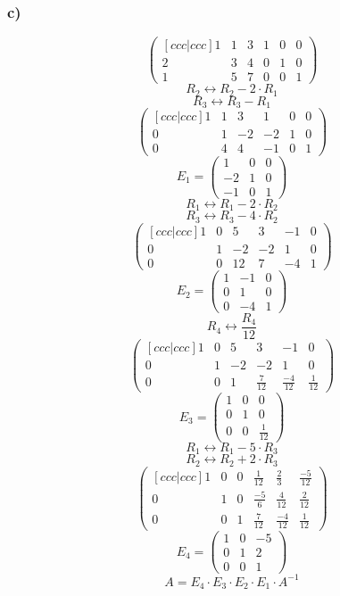 \documentclass[lineaire_algebra_oplossingen.tex]{subfiles}
\begin{document}
\subsubsection*{c)}
\[
\begin{pmatrix}[ccc|ccc]
1 & 1 & 3 & 1 & 0 & 0\\
2 & 3 & 4 & 0 & 1 & 0\\
1 & 5 & 7 & 0 & 0 & 1
\end{pmatrix}
\]
\[ R_2 \leftrightarrow R_2 - 2 \cdot R_1 \]
\[ R_3 \leftrightarrow R_3 - R_1 \]
\[ 
\begin{pmatrix}[ccc|ccc]
1 & 1 & 3 & 1 & 0 & 0\\
0 & 1 & -2 & -2 & 1 & 0\\
0 & 4 & 4  & -1 & 0 & 1
\end{pmatrix}
\]
\[E_1 =
\begin{pmatrix}
1 & 0 & 0\\
-2 & 1 & 0\\
-1 & 0 & 1
\end{pmatrix}
\]
\[ R_1 \leftrightarrow R_1 - 2 \cdot R_2 \]
\[ R_3 \leftrightarrow R_3 - 4 \cdot R_2 \]
\[ 
\begin{pmatrix}[ccc|ccc]
1 & 0 & 5 & 3 & -1 & 0\\
0 & 1 & -2 & -2 & 1 & 0\\
0 & 0 & 12 & 7 & -4 & 1
\end{pmatrix}
\]
\[E_2 =
\begin{pmatrix}
1 & -1 & 0\\
0 & 1 & 0\\
0 & -4 & 1
\end{pmatrix}
\]
\[ R_4 \leftrightarrow\frac{R_4}{12} \]
\[ 
\begin{pmatrix}[ccc|ccc]
1 & 0 & 5 & 3 & -1 & 0\\
0 & 1 & -2 & -2 & 1 & 0\\
0 & 0 & 1 & \frac{7}{12} & \frac{-4}{12} & \frac{1}{12}
\end{pmatrix}
\]
\[ E_3 =
\begin{pmatrix}
1 & 0 & 0\\
0 & 1 & 0\\
0 & 0 & \frac{1}{12}
\end{pmatrix}
\]
\[ R_1 \leftrightarrow R_1 - 5 \cdot R_3 \]
\[ R_2 \leftrightarrow R_2 + 2 \cdot R_3 \]
\[ 
\begin{pmatrix}[ccc|ccc]
1 & 0 & 0 & \frac{1}{12} & \frac{2}{3} & \frac{-5}{12}\\
0 & 1 & 0 & \frac{-5}{6} & \frac{4}{12} & \frac{2}{12}\\
0 & 0 & 1 & \frac{7}{12} & \frac{-4}{12} & \frac{1}{12}
\end{pmatrix}
\]
\[ E_4 =
\begin{pmatrix}
1 & 0 & -5\\
0 & 1 & 2\\
0 & 0 & 1
\end{pmatrix}
\]
\[ A = E_4 \cdot E_3 \cdot E_2 \cdot E_1 \cdot A^{-1} \]
\end{document}
